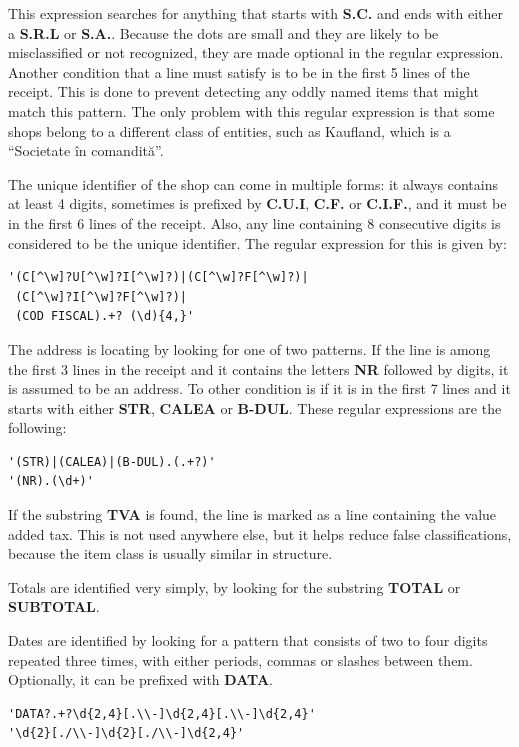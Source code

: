 This expression searches for anything that starts with \textbf{S.C.} and ends with either a \textbf{S.R.L} or \textbf{S.A.}. Because the dots are small and they are likely to be misclassified or not recognized, they are made optional in the regular expression. Another condition that a line must satisfy is to be in the first 5 lines of the receipt. This is done to prevent detecting any oddly named items that might match this pattern. The only problem with this regular expression is that some shops belong to a different class of entities, such as Kaufland, which is a ``Societate în comandită''.

The unique identifier of the shop can come in multiple forms: it always contains at least 4 digits, sometimes is prefixed by \textbf{C.U.I}, \textbf{C.F.} or \textbf{C.I.F.}, and it must be in the first 6 lines of the receipt. Also, any line containing 8 consecutive digits is considered to be the unique identifier. The regular expression for this is given by:

\begin{lstlisting}
'(C[^\w]?U[^\w]?I[^\w]?)|(C[^\w]?F[^\w]?)|
 (C[^\w]?I[^\w]?F[^\w]?)|
 (COD FISCAL).+? (\d){4,}'
\end{lstlisting}

The address is locating by looking for one of two patterns. If the line is among the first 3 lines in the receipt and it contains the letters \textbf{NR} followed by digits, it is assumed to be an address. To other condition is if it is in the first 7 lines and it starts with either \textbf{STR}, \textbf{CALEA} or \textbf{B-DUL}. These regular expressions are the following:

\begin{lstlisting}
'(STR)|(CALEA)|(B-DUL).(.+?)'
'(NR).(\d+)'
\end{lstlisting}

If the substring \textbf{TVA} is found, the line is marked as a line containing the value added tax. This is not used anywhere else, but it helps reduce false classifications, because the item class is usually similar in structure. 

Totals are identified very simply, by looking for the substring \textbf{TOTAL} or \textbf{SUBTOTAL}.

Dates are identified by looking for a pattern that consists of two to four digits repeated three times, with either periods, commas or slashes between them. Optionally, it can be prefixed with \textbf{DATA}.

\begin{lstlisting}
'DATA?.+?\d{2,4}[.\\-]\d{2,4}[.\\-]\d{2,4}'
'\d{2}[./\\-]\d{2}[./\\-]\d{2,4}'
\end{lstlisting}

